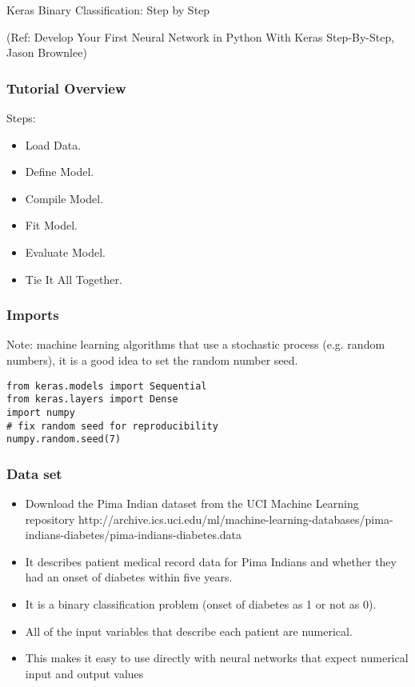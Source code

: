 \begin{frame}
  \begin{center}
    {\Large Keras Binary Classification: Step by Step}
    
    \tiny{(Ref:  Develop Your First Neural Network in Python With Keras Step-By-Step, Jason Brownlee)}
  \end{center}
\end{frame}

\begin{frame}[fragile] \frametitle{Tutorial Overview}
Steps:
\begin{itemize}
\item  Load Data.
\item  Define Model.
\item  Compile Model.
\item  Fit Model.
\item  Evaluate Model.
\item  Tie It All Together.

\end{itemize}
\end{frame}

\begin{frame}[fragile] \frametitle{Imports}
Note: machine learning algorithms that use a stochastic process (e.g. random numbers), it is a good idea to set the random number seed.
\begin{lstlisting}
from keras.models import Sequential
from keras.layers import Dense
import numpy
# fix random seed for reproducibility
numpy.random.seed(7)
\end{lstlisting}
\end{frame}

\begin{frame}[fragile] \frametitle{Data set}
 \begin{itemize}
 \item  Download the Pima Indian dataset from the UCI Machine Learning repository http://archive.ics.uci.edu/ml/machine-learning-databases/pima-indians-diabetes/pima-indians-diabetes.data 
\item  It describes patient medical record data for Pima Indians and whether they had an onset of diabetes within five years.
\item  It is a binary classification problem (onset of diabetes as 1 or not as 0). 
\item All of the input variables that describe each patient are numerical. 
\item This makes it easy to use directly with neural networks that expect numerical input and output values
\end{itemize}
\end{frame}

